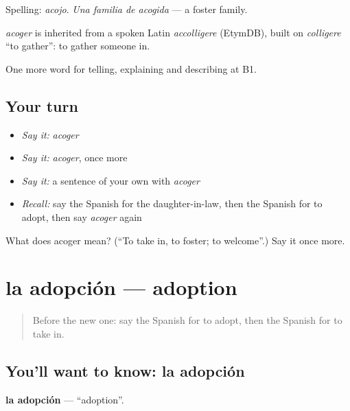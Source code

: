 Spelling: \emph{acojo}. \emph{Una familia de acogida} — a foster family.

\begin{cousinweb}
\emph{acoger} is inherited from a spoken Latin \emph{accolligere} (EtymDB), built on \emph{colligere} \textquotedblleft{}to gather\textquotedblright{}: to gather someone in.
\end{cousinweb}

\begin{grammarlens}[title={What you've built}]
One more word for telling, explaining and describing at B1.
\end{grammarlens}

\subsection*{Your turn}
\begin{itemize}
\raggedright
  \item \emph{Say it:} \emph{acoger}
  \item \emph{Say it:} \emph{acoger}, once more
  \item \emph{Say it:} a sentence of your own with \emph{acoger}
  \item \emph{Recall:} say the Spanish for the daughter-in-law, then the Spanish for to adopt, then say \emph{acoger} again
\end{itemize}

\begin{tcolorbox}[breakable,colback=teal!4,colframe=teal!35!black,title={Before you move on}]
What does acoger mean? (\textquotedblleft{}To take in, to foster; to welcome\textquotedblright{}.) Say it once more.
\end{tcolorbox}
\section[la adopción]{la adopción — adoption}

\label{lesson:ES-C748-adopcion}



\begin{quote}
Before the new one: say the Spanish for to adopt, then the Spanish for to take in.
\end{quote}

\subsection*{You'll want to know: la adopción}
\textbf{la adopción} — \textquotedblleft{}adoption\textquotedblright{}.

